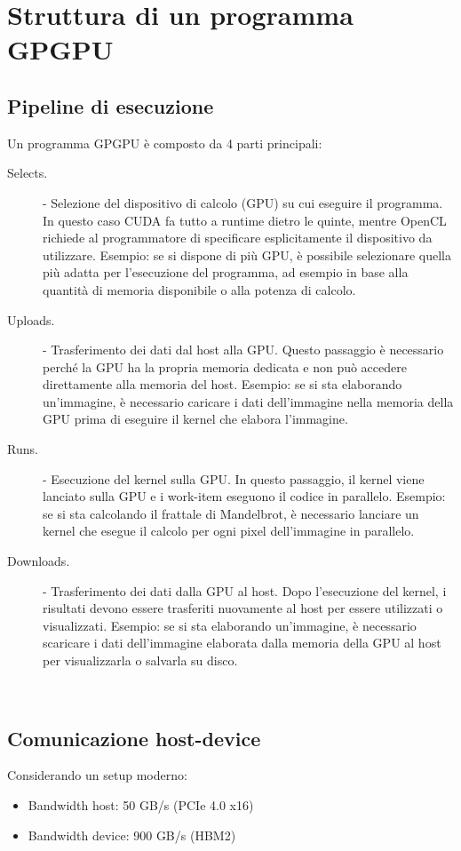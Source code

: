 \section{Struttura di un programma GPGPU}

\subsection{Pipeline di esecuzione}
Un programma GPGPU è composto da 4 parti principali:
\begin{description}
    \item[Selects.] - Selezione del dispositivo di calcolo (GPU) su cui eseguire il programma. In questo caso CUDA fa tutto a runtime dietro le quinte, mentre OpenCL richiede al programmatore di specificare esplicitamente il dispositivo da utilizzare. 
    Esempio: se si dispone di più GPU, è possibile selezionare quella più adatta per l'esecuzione del programma, ad esempio in base alla quantità di memoria disponibile o alla potenza di calcolo.
    \item[Uploads.] - Trasferimento dei dati dal host alla GPU. Questo passaggio è necessario perché la GPU ha la propria memoria dedicata e non può accedere direttamente alla memoria del host.
    Esempio: se si sta elaborando un'immagine, è necessario caricare i dati dell'immagine nella memoria della GPU prima di eseguire il kernel che elabora l'immagine.
    \item[Runs.] - Esecuzione del kernel sulla GPU. In questo passaggio, il kernel viene lanciato sulla GPU e i work-item eseguono il codice in parallelo. 
    Esempio: se si sta calcolando il frattale di Mandelbrot, è necessario lanciare un kernel che esegue il calcolo per ogni pixel dell'immagine in parallelo.
    \item[Downloads.] - Trasferimento dei dati dalla GPU al host. Dopo l'esecuzione del kernel, i risultati devono essere trasferiti nuovamente al host per essere utilizzati o visualizzati.
    Esempio: se si sta elaborando un'immagine, è necessario scaricare i dati dell'immagine elaborata dalla memoria della GPU al host per visualizzarla o salvarla su disco. 
\end{description}\

\subsection{Comunicazione host-device}
Considerando un setup moderno:
\begin{itemize}
    \item Bandwidth host: 50 GB/s (PCIe 4.0 x16)
    \item Bandwidth device: 900 GB/s (HBM2)
\end{itemize}

